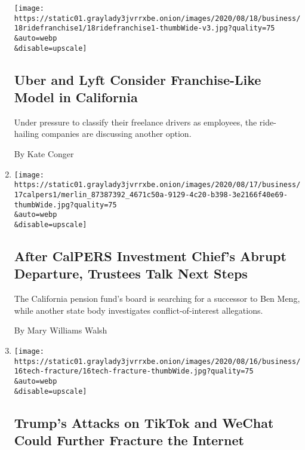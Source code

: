 \begin{enumerate}
  \texttt{[image: https://static01.graylady3jvrrxbe.onion/images/2020/08/18/business/18ridefranchise1/18ridefranchise1-thumbWide-v3.jpg?quality=75\\\&auto=webp\\\&disable=upscale]}

  \hypertarget{uber-and-lyft-consider-franchise-like-model-in-california}{%
  \subsection{Uber and Lyft Consider Franchise-Like Model in
  California}\label{uber-and-lyft-consider-franchise-like-model-in-california}}

  Under pressure to classify their freelance drivers as employees, the
  ride-hailing companies are discussing another option.

  By Kate Conger
\item
  \href{/2020/08/17/business/dealbook/CalPERS-Ben-Meng-trustees.html}{}

  \texttt{[image: https://static01.graylady3jvrrxbe.onion/images/2020/08/17/business/17calpers1/merlin\_87387392\_4671c50a-9129-4c20-b398-3e2166f40e69-thumbWide.jpg?quality=75\\\&auto=webp\\\&disable=upscale]}

  \hypertarget{after-calpers-investment-chiefs-abrupt-departure-trustees-talk-next-steps}{%
  \subsection{After CalPERS Investment Chief's Abrupt Departure,
  Trustees Talk Next
  Steps}\label{after-calpers-investment-chiefs-abrupt-departure-trustees-talk-next-steps}}

  The California pension fund's board is searching for a successor to
  Ben Meng, while another state body investigates conflict-of-interest
  allegations.

  By Mary Williams Walsh
\item
  \href{/2020/08/17/technology/trump-tiktok-wechat-ban.html}{}

  \texttt{[image: https://static01.graylady3jvrrxbe.onion/images/2020/08/16/business/16tech-fracture/16tech-fracture-thumbWide.jpg?quality=75\\\&auto=webp\\\&disable=upscale]}

  \hypertarget{trumps-attacks-on-tiktok-and-wechat-could-further-fracture-the-internet}{%
  \subsection{Trump's Attacks on TikTok and WeChat Could Further
  Fracture the
  Internet}\label{trumps-attacks-on-tiktok-and-wechat-could-further-fracture-the-internet}}


\end{enumerate}
